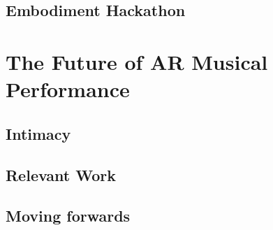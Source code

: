 \subsection{Embodiment Hackathon} \label{sec: 
polygons-demonstrations-emh}



\section{The Future of AR Musical Performance}
\subsection{Intimacy}
\subsection{Relevant Work}
\subsection{Moving forwards}